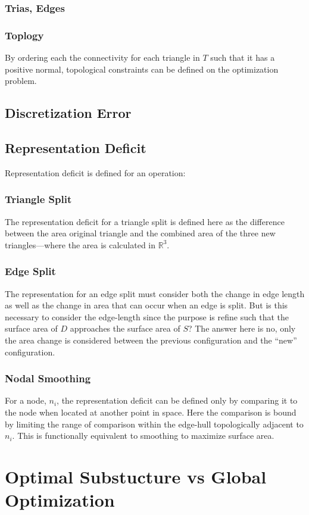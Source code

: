 \documentclass[11pt]{article}
\begin{document}
\subsubsection{Trias, Edges}
\subsubsection{Toplogy}
By ordering each the connectivity for each triangle in $T$ such that it
has a positive normal, topological constraints can be defined on the
optimization problem.
\subsection{Discretization Error}
\subsection{Representation Deficit}
Representation deficit is defined for an operation:
\subsubsection{Triangle Split}
The representation deficit for a triangle split is defined here as the
difference between the area original triangle and the combined area of
the three new triangles---where the area is calculated in ${\mathbb
R}^3$.
\subsubsection{Edge Split}
The representation for an edge split must consider both the change in
edge length as well as the change in area that can occur when an edge is
split. But is this necessary to consider the edge-length since the
purpose is refine such that the surface area of $D$ approaches the
surface area of $S$? The answer here is no, only the area change is
considered between the previous configuration and the ``new''
configuration.
\subsubsection{Nodal Smoothing}
For a node, $n_i$, the representation deficit can be defined only by comparing
it to the node when located at another point in space. Here the
comparison is bound by limiting the range of comparison within the edge-hull
topologically adjacent to $n_i$. This is functionally equivalent to
smoothing to maximize surface area.
\section{Optimal Substucture vs Global Optimization}
\end{document}
